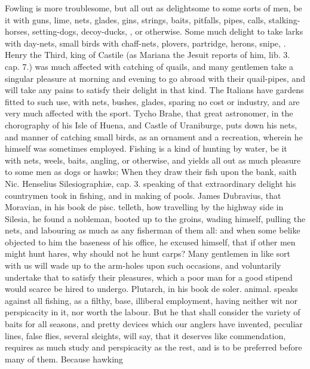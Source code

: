 {Fowling is more troublesome, but all out as delightsome to some sorts
of men, be it with guns, lime, nets, glades, gins, strings, baits,
pitfalls, pipes, calls, stalking-horses, setting-dogs, decoy-ducks,
\etc{}, or otherwise. Some much delight to take larks with day-nets, small
birds with chaff-nets, plovers, partridge, herons, snipe, \etc{}. Henry the
Third, king of Castile (as Mariana the Jesuit reports of him, lib. 3.
cap. 7.) was much affected with catching of quails, and many
gentlemen take a singular pleasure at morning and evening to go abroad
with their quail-pipes, and will take any pains to satisfy their
delight in that kind. The Italians have gardens fitted to such
use, with nets, bushes, glades, sparing no cost or industry, and are
very much affected with the sport. Tycho Brahe, that great astronomer,
in the chorography of his Isle of Huena, and Castle of Uraniburge, puts
down his nets, and manner of catching small birds, as an ornament and a
recreation, wherein he himself was sometimes employed.
Fishing is a kind of hunting by water, be it with nets, weels, baits,
angling, or otherwise, and yields all out as much pleasure to some men
as dogs or hawks; When they draw their fish upon the bank, saith
Nic. Henselius Silesiographi\ae{}, cap. 3. speaking of that extraordinary
delight his countrymen took in fishing, and in making of pools. James
Dubravius, that Moravian, in his book de pisc. telleth, how travelling
by the highway side in Silesia, he found a nobleman, booted up to
the groins, wading himself, pulling the nets, and labouring as much as
any fisherman of them all: and when some belike objected to him the
baseness of his office, he excused himself, that if other men
might hunt hares, why should not he hunt carps? Many gentlemen in like
sort with us will wade up to the arm-holes upon such occasions, and
voluntarily undertake that to satisfy their pleasures, which a poor man
for a good stipend would scarce be hired to undergo. Plutarch, in his
book de soler. animal. speaks against all fishing, as a filthy,
base, illiberal employment, having neither wit nor perspicacity in it,
nor worth the labour. But he that shall consider the variety of baits
for all seasons, and pretty devices which our anglers have invented,
peculiar lines, false flies, several sleights, \etc{} will say, that it
deserves like commendation, requires as much study and perspicacity as
the rest, and is to be preferred before many of them. Because hawking
}
